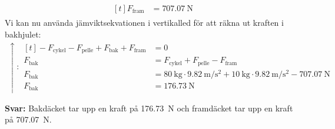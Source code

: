 \documentclass[11pt]{article}
\begin{document}
\begin{enumerate}[itemsep=2em]
\begin{align*}
\begin{aligned}[t]
                                                             F_{\text{fram}}                                                                                                                                                                                                   & = \SI{707.07}{\newton}
                                                     \end{aligned}
              \end{align*}
              Vi kan nu använda jämviktsekvationen i vertikalled för att räkna ut kraften i bakhjulet:
              \begin{align*}
                      \uparrow : \begin{aligned}[t]
                                         - F_{\text{cykel}} - F_{\text{pelle}} + F_{\text{bak}} + F_{\text{fram}} & = 0                                                                                                                                                \\
                                         F_{\text{bak}}                                                           & = F_{\text{cykel}} + F_{\text{pelle}} - F_{\text{fram}}                                                                                            \\
                                         F_{\text{bak}}                                                           & = \SI{80}{\kilo\gram} \cdot \SI{9.82}{\meter/\second\squared} + \SI{10}{\kilo\gram} \cdot \SI{9.82}{\meter/\second\squared} - \SI{707.07}{\newton} \\
                                         F_{\text{bak}}                                                           & = \SI{176.73}{\newton}
                                 \end{aligned}
              \end{align*}

              \textbf{Svar: } Bakdäcket tar upp en kraft på \SI{176.73}{\newton} och framdäcket tar upp en kraft på \SI{707.07}{\newton}.



\end{enumerate}
\vfill
\begin{center}
\end{center}
\end{document}
